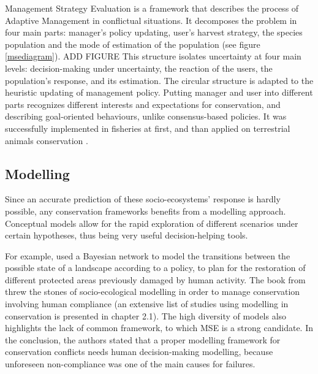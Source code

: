 \documentclass[12pt,a4paper]{article}
\begin{document}
Management Strategy Evaluation is a framework that describes the process of Adaptive Management in conflictual situations.
It decomposes the problem in four main parts: manager's policy updating, user's harvest strategy, the species population and the mode of estimation of the population (see figure \ref{msediagram}). ADD FIGURE
This structure isolates uncertainty at four main levels: decision-making under uncertainty, the reaction of the users, the population's response,
and its estimation.
The circular structure is adapted to the heuristic updating of management policy.
Putting manager and user into different parts recognizes different interests and expectations for conservation, and describing goal-oriented behaviours, unlike consensus-based policies.
It was successfully implemented in fisheries at first, and than applied on terrestrial animals conservation \citep{BUNNEFELD2011441, bunnefeld2013incentivizing}.

\subsection{Modelling}

Since an accurate prediction of these socio-ecosystems' response is hardly possible, any conservation frameworks benefits from a modelling approach.
Conceptual models allow for the rapid exploration of different scenarios under certain hypotheses, thus being very useful decision-helping tools.
%

For example, \cite{rumpff2011state} used a Bayesian network to model the transitions between the possible state of a landscape according to a policy, to plan for the restoration of different protected areas previously damaged by human activity.
The book from \cite{schluter2012new} threw the stones of socio-ecological modelling in order to manage conservation involving human compliance (an extensive list of studies using modelling in conservation is presented in chapter 2.1).
The high diversity of models also highlights the lack of common framework, to which MSE is a strong candidate.
In the conclusion, the authors stated that a proper modelling framework for conservation conflicts needs human decision-making modelling, because unforeseen non-compliance was one of the main causes for failures.\\
%
\end{document}
